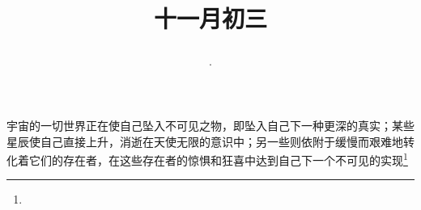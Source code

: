 \title{\date[d=3,m=12,y=2024][year:cn-y,年,month:cn,day:cn,日,·,weekday]·十一月初三 }
宇宙的一切世界正在使自己坠入不可见之物，即坠入自己下一种更深的真实；某些星辰使自己直接上升，消逝在天使无限的意识中；另一些则依附于缓慢而艰难地转化着它们的存在者，在这些存在者的惊惧和狂喜中达到自己下一个不可见的实现\footnote{ }

